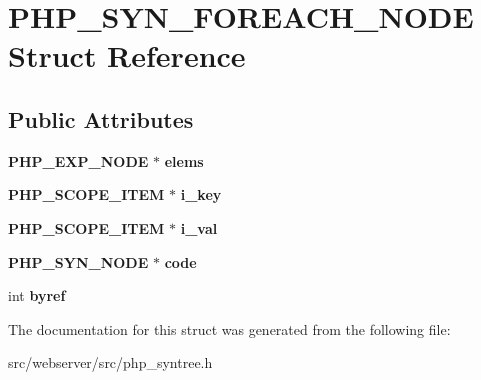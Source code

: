 \section{PHP\_\-SYN\_\-FOREACH\_\-NODE Struct Reference}
\label{structPHP__SYN__FOREACH__NODE}
\subsection*{Public Attributes}
\begin{DoxyCompactItemize}
\item 
{\bf PHP\_\-EXP\_\-NODE} $\ast$ {\bfseries elems}\label{structPHP__SYN__FOREACH__NODE_a5dfbb09f143e8fcca35bb6ec4dd10dbb}

\item 
{\bf PHP\_\-SCOPE\_\-ITEM} $\ast$ {\bfseries i\_\-key}\label{structPHP__SYN__FOREACH__NODE_a8adb2644277fd69a80f0ae77a5e0ca26}

\item 
{\bf PHP\_\-SCOPE\_\-ITEM} $\ast$ {\bfseries i\_\-val}\label{structPHP__SYN__FOREACH__NODE_aa37a092cbc2f09699aa641f9dde92df7}

\item 
{\bf PHP\_\-SYN\_\-NODE} $\ast$ {\bfseries code}\label{structPHP__SYN__FOREACH__NODE_afc3c0980ea489bab5e86904791c41811}

\item 
int {\bfseries byref}\label{structPHP__SYN__FOREACH__NODE_a3c2a56aac0b76f490a0bc9a5acf71167}

\end{DoxyCompactItemize}


The documentation for this struct was generated from the following file:\begin{DoxyCompactItemize}
\item 
src/webserver/src/php\_\-syntree.h\end{DoxyCompactItemize}
